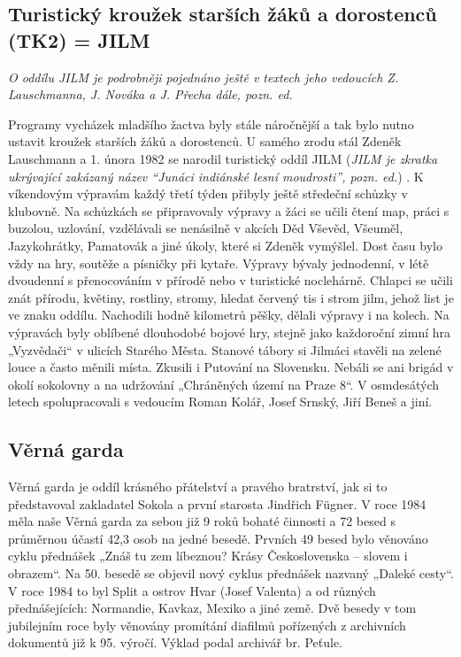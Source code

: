 \subsection{Turistický kroužek starších žáků a dorostenců (TK2) =
JILM}\label{turistickuxfd-krouux17eek-starux161uxedch-ux17euxe1kux16f-a-dorostencux16f-tk2-jilm}

\emph{O oddílu JILM je podrobněji pojednáno ještě v textech jeho
vedoucích Z. Lauschmanna, J. Nováka a J. Přecha dále, pozn. ed.}

Programy vycházek mladšího žactva byly stále náročnější a tak bylo nutno
ustavit kroužek starších žáků a dorostenců. U samého zrodu stál Zdeněk
Lauschmann a 1. února 1982 se narodil turistický oddíl JILM (\emph{JILM
je zkratka ukrývající zakázaný název ``Junáci indiánské lesní
moudrosti'', pozn. ed.}) . K víkendovým výpravám každý třetí týden
přibyly ještě středeční schůzky v klubovně. Na schůzkách se připravovaly
výpravy a žáci se učili čtení map, práci s buzolou, uzlování, vzdělávali
se nenásilně v akcích Děd Vševěd, Všeuměl, Jazykohrátky, Pamatovák a
jiné úkoly, které si Zdeněk vymýšlel. Dost času bylo vždy na hry,
soutěže a písničky při kytaře. Výpravy bývaly jednodenní, v létě
dvoudenní s přenocováním v přírodě nebo v turistické noclehárně. Chlapci
se učili znát přírodu, květiny, rostliny, stromy, hledat červený tis i
strom jilm, jehož list je ve znaku oddílu. Nachodili hodně kilometrů
pěšky, dělali výpravy i na kolech. Na výpravách byly oblíbené dlouhodobé
bojové hry, stejně jako každoroční zimní hra „Vyzvědači`` v ulicích
Starého Města. Stanové tábory si Jilmáci stavěli na zelené louce a často
měnili místa. Zkusili i Putování na Slovensku. Nebáli se ani brigád v
okolí sokolovny a na udržování „Chráněných území na Praze 8``. V
osmdesátých letech spolupracovali s vedoucím Roman Kolář, Josef Srnský,
Jiří Beneš a jiní.

\subsection{Věrná garda}\label{vux11brnuxe1-garda}

Věrná garda je oddíl krásného přátelství a pravého bratrství, jak si to
představoval zakladatel Sokola a první starosta Jindřich Fügner. V roce
1984 měla naše Věrná garda za sebou již 9 roků bohaté činnosti a 72
besed s průměrnou účastí 42,3 osob na jedné besedě. Prvních 49 besed
bylo věnováno cyklu přednášek „Znáš tu zem líbeznou? Krásy
Československa -- slovem i obrazem``. Na 50. besedě se objevil nový
cyklus přednášek nazvaný „Daleké cesty``. V roce 1984 to byl Split a
ostrov Hvar (Josef Valenta) a od různých přednášejících: Normandie,
Kavkaz, Mexiko a jiné země. Dvě besedy v tom jubilejním roce byly
věnovány promítání diafilmů pořízených z archivních dokumentů již k 95.
výročí. Výklad podal archivář br. Peťule.

